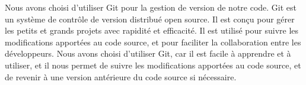 Nous avons choisi d'utiliser Git pour la gestion de version de notre code. Git
est un système de contrôle de version distribué open source. Il est conçu pour
gérer les petits et grands projets avec rapidité et efficacité. Il est
utilisé pour suivre les modifications apportées au code source, et pour
faciliter la collaboration entre les développeurs. Nous avons choisi d'utiliser
Git, car il est facile à apprendre et à utiliser, et il nous permet de suivre
les modifications apportées au code source, et de revenir à une version
antérieure du code source si nécessaire.
